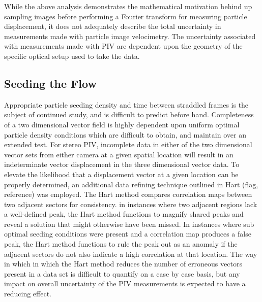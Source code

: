While the above analysis demonstrates the mathematical motivation behind up 
sampling images before performing a Fourier transform for measuring particle 
displacement, it does not adequately describe the total uncertainty in 
measurements made with particle image velocimetry. The uncertainty associated 
with measurements made with PIV are dependent upon the geometry of the specific 
optical setup used to take the data.


\subsection{Seeding the Flow}

Appropriate particle seeding density and time between straddled frames is the
subject of continued study, and is difficult to predict before hand. 
Completeness of a two dimensional vector field is highly dependent upon 
uniform
optimal particle density conditions which are difficult to obtain, and maintain
over an extended test. For stereo PIV, incomplete data in either of the two 
dimensional vector 
sets from either camera at a given spatial location will result in an 
indeterminate vector displacement in the three dimensional vector data. To 
elevate the likelihood that a displacement vector at a given location can be 
properly determined, an additional data refining technique outlined in Hart 
(flag, reference) was employed. The Hart method compares correlation maps 
between two adjacent sectors for consistency. in instances where two adjacent 
regions lack a well-defined peak, the Hart method functions to magnify shared 
peaks and reveal a solution that might otherwise have been missed. In instances 
where sub optimal seeding conditions were present and a correlation map 
produces a false peak, the Hart method functions to rule the peak out as an 
anomaly if the adjacent sectors do not also indicate a high correlation at that 
location. The way in which in which the Hart method reduces the number of 
erroneous vectors present in a data set is difficult to quantify on a case by 
case basis, but any impact on overall uncertainty of the PIV measurements is 
expected to have a reducing effect. 